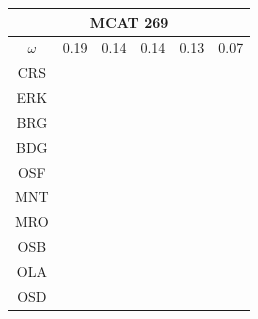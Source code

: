 \documentclass[12pt]{article}
\begin{document}
\begin{landscape}
\begin{figure}
\begin{minipage}[c]{0.3\textwidth}
\begin{tabular}{|c|c|c|c|c|c|}
\end{tabular}
\end{minipage}
\begin{minipage}[c]{0.3\textwidth}
\hspace*{-2.5cm}
\begin{tabular}{|c|c|c|c|c|c|}%
         \hline \multicolumn{6}{|c|}{MCAT 269} \\ \hline
         $\omega$&0.19&0.14&0.14&0.13&0.07\\ \hline %
        CRS&\cellcolor[HTML]{E41A1C}&\cellcolor[HTML]{E41A1C}&\cellcolor[HTML]{E41A1C}&\cellcolor[HTML]{E41A1C}&\cellcolor[HTML]{E41A1C}\\ \hline %
        ERK&\cellcolor[HTML]{E41A1C}&\cellcolor[HTML]{E41A1C}&\cellcolor[HTML]{E41A1C}&\cellcolor[HTML]{E41A1C}&\cellcolor[HTML]{E41A1C}\\ \hline %
        BRG&\cellcolor[HTML]{E41A1C}&\cellcolor[HTML]{E41A1C}&\cellcolor[HTML]{E41A1C}&\cellcolor[HTML]{E41A1C}&\cellcolor[HTML]{E41A1C}\\ \hline %
        BDG&\cellcolor[HTML]{377EB8}&\cellcolor[HTML]{377EB8}&\cellcolor[HTML]{377EB8}&\cellcolor[HTML]{377EB8}&\cellcolor[HTML]{377EB8}\\ \hline %
        OSF&\cellcolor[HTML]{377EB8}&\cellcolor[HTML]{377EB8}&\cellcolor[HTML]{377EB8}&\cellcolor[HTML]{377EB8}&\cellcolor[HTML]{377EB8}\\ \hline %
        MNT&\cellcolor[HTML]{377EB8}&\cellcolor[HTML]{377EB8}&\cellcolor[HTML]{377EB8}&\cellcolor[HTML]{377EB8}&\cellcolor[HTML]{377EB8}\\ \hline %
        MRO&\cellcolor[HTML]{4DAF4A}&\cellcolor[HTML]{4DAF4A}&\cellcolor[HTML]{4DAF4A}&\cellcolor[HTML]{4DAF4A}&\cellcolor[HTML]{4DAF4A}\\ \hline %
        OSB&\cellcolor[HTML]{984EA3}&\cellcolor[HTML]{984EA3}&\cellcolor[HTML]{984EA3}&\cellcolor[HTML]{4DAF4A}&\cellcolor[HTML]{4DAF4A}\\ \hline %
        OLA&\cellcolor[HTML]{FF7F00}&\cellcolor[HTML]{984EA3}&\cellcolor[HTML]{FF7F00}&\cellcolor[HTML]{984EA3}&\cellcolor[HTML]{984EA3}\\ \hline %
        OSD&\cellcolor[HTML]{FFFF33}&\cellcolor[HTML]{FF7F00}&\cellcolor[HTML]{FF7F00}&\cellcolor[HTML]{FF7F00}&\cellcolor[HTML]{984EA3}\\ \hline %
\end{tabular}\\$~$\\$~$\\

\end{minipage}
\end{figure}
\end{landscape}
\end{document}
